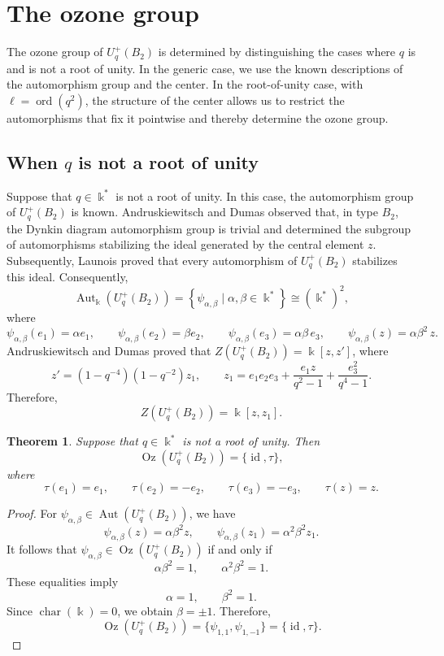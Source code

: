 \documentclass[11pt]{article}
\newtheorem{theorem}{Theorem}[section]
\theoremstyle{definition}
\newcommand{\K}{\Bbbk}
\begin{document}
\section[The case where q is not a root of unity]{The ozone group }
The ozone group of \(U_q^{+}(B_2)\) is determined by distinguishing the
cases where \(q\) is and is not a root of unity. In the generic case, we
use the known descriptions of the automorphism group and the center. In
the root-of-unity case, with \(\ell=\operatorname{ord}(q^2)\), the
structure of the center allows us to restrict the automorphisms that fix
it pointwise and thereby determine the ozone group.


\subsection[The case where q is not a root of unity]{When \(q\) is not a root of unity}
Suppose that \(q\in\K^{*}\) is not a root of unity. In this case, the
automorphism group of \(U_q^{+}(B_2)\) is known. Andruskiewitsch and Dumas
\cite[Remark~3.2 and Proposition~3.3]{AndruskiewitschDumas2008}
observed that, in type \(B_2\), the Dynkin diagram automorphism group is
trivial and determined the subgroup of automorphisms stabilizing the ideal
generated by the central element \(z\). Subsequently, Launois
\cite[Proposition~4.3 and Theorem~4.4]{Launois2007} proved that every
automorphism of \(U_q^{+}(B_2)\) stabilizes this ideal. Consequently,
\[
\operatorname{Aut}_{\K}\!\left(U_q^{+}(B_2)\right)
=
\left\{
\psi_{\alpha,\beta}
\mid
\alpha,\beta\in\K^{*}
\right\}
\cong
(\K^{*})^{2},
\]
where
\[
\psi_{\alpha,\beta}(e_1)=\alpha e_1,\qquad
\psi_{\alpha,\beta}(e_2)=\beta e_2,\qquad
\psi_{\alpha,\beta}(e_3)=\alpha\beta\,e_3,\qquad
\psi_{\alpha,\beta}(z)=\alpha\beta^2\,z.
\]
Andruskiewitsch and Dumas
\cite[Lemma~3.1]{AndruskiewitschDumas2008} proved that
\(Z\!\left(U_q^{+}(B_2)\right)=\K[z,z']\), where
\[
z'=(1-q^{-4})(1-q^{-2})z_1,
\qquad
z_1=e_1e_2e_3+\frac{e_1z}{q^2-1}+\frac{e_3^2}{q^4-1}.
\]
Therefore,
\[
Z\!\left(U_q^{+}(B_2)\right)=\K[z,z_1].
\]
\begin{theorem}
Suppose that \(q\in\K^{*}\) is not a root of unity. Then
\[
\operatorname{Oz}\!\left(U_q^{+}(B_2)\right)
=
\{\operatorname{id},\tau\},
\]
where
\[
\tau(e_1)=e_1,
\qquad
\tau(e_2)=-e_2,
\qquad
\tau(e_3)=-e_3,
\qquad
\tau(z)=z.
\]
\end{theorem}

\begin{proof}
For
\(\psi_{\alpha,\beta}\in\operatorname{Aut}(U_q^{+}(B_2))\),
we have
\[
\psi_{\alpha,\beta}(z)=\alpha\beta^2z,
\qquad
\psi_{\alpha,\beta}(z_1)=\alpha^2\beta^2z_1.
\]
It follows that
\(\psi_{\alpha,\beta}\in\operatorname{Oz}\!\left(U_q^{+}(B_2)\right)\)
if and only if
\[
\alpha\beta^2=1,
\qquad
\alpha^2\beta^2=1.
\]
These equalities imply
\[
\alpha=1,
\qquad
\beta^2=1.
\]
Since \(\operatorname{char}(\K)=0\), we obtain \(\beta=\pm1\). Therefore,
\[
\operatorname{Oz}\!\left(U_q^{+}(B_2)\right)
=
\{\psi_{1,1},\psi_{1,-1}\}
=
\{\operatorname{id},\tau\}.
\]
\end{proof}
\end{document}
